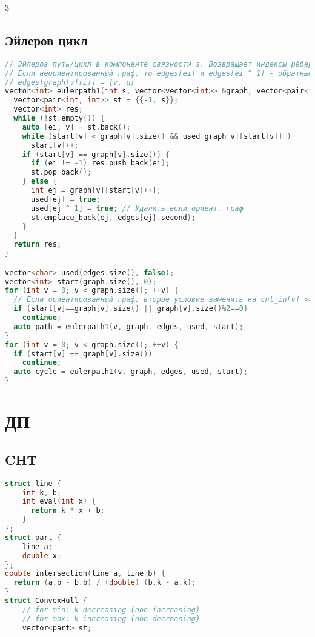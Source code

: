 \documentclass[9pt,a4paper,landscape,twosided]{extarticle}
\begin{document}
\begin{multicols*}{3}
\subsection{Эйлеров цикл}
\begin{lstlisting}[language=C++]
// Эйлеров путь/цикл в компоненте связности s. Возвращает индексы рёбер. Если пути/цикла нет, то алгос найдёт хуйню.
// Если неориентированный граф, то edges[ei] и edges[ei ^ 1] - обратные друг к другу рёбра.
// edges[graph[v][i]] = {v, u}
vector<int> eulerpath1(int s, vector<vector<int>> &graph, vector<pair<int, int>> &edges, vector<char> &used, vector<int> &start) {
  vector<pair<int, int>> st = {{-1, s}};
  vector<int> res;
  while (!st.empty()) {
    auto [ei, v] = st.back();
    while (start[v] < graph[v].size() && used[graph[v][start[v]]])
      start[v]++;
    if (start[v] == graph[v].size()) {
      if (ei != -1) res.push_back(ei);
      st.pop_back();
    } else {
      int ej = graph[v][start[v]++];
      used[ej] = true;
      used[ej ^ 1] = true; // Удалить если ориент. граф
      st.emplace_back(ej, edges[ej].second);
    }
  }
  return res;
}

vector<char> used(edges.size(), false);
vector<int> start(graph.size(), 0);
for (int v = 0; v < graph.size(); ++v) {
  // Если ориентированный граф, второе условие заменить на cnt_in[v] >= cnt_out[v]
  if (start[v]==graph[v].size() || graph[v].size()%2==0)
    continue;
  auto path = eulerpath1(v, graph, edges, used, start);
}
for (int v = 0; v < graph.size(); ++v) {
  if (start[v] == graph[v].size())
    continue;
  auto cycle = eulerpath1(v, graph, edges, used, start);
}

\end{lstlisting}

\section{ДП}

\subsection{CHT}
\begin{lstlisting}[language=C++]
struct line {
    int k, b;
    int eval(int x) {
      return k * x + b;
    }
};
struct part {
    line a;
    double x;
};
double intersection(line a, line b) {
  return (a.b - b.b) / (double) (b.k - a.k);
}
struct ConvexHull {
    // for min: k decreasing (non-increasing)
    // for max: k increasing (non-decreasing)
    vector<part> st;


\end{lstlisting}
\end{multicols*}
\end{document}

